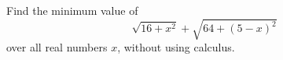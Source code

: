 Find the minimum value of
\[\sqrt{16+x^2}+\sqrt{64+(5-x)^2}\]
over all real numbers $x$, without using calculus.
